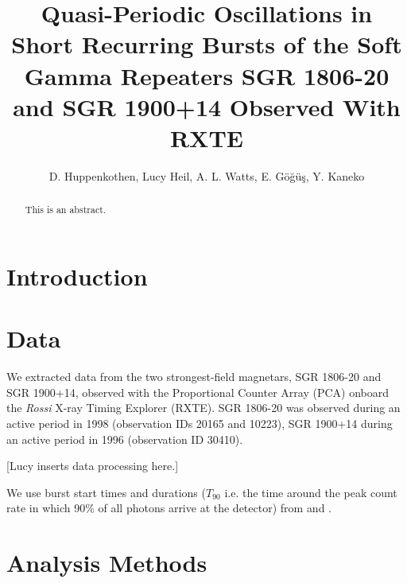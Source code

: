 \documentclass[numberedappendix]{emulateapj}
\begin{document}
\title{Quasi-Periodic Oscillations in Short Recurring Bursts of the Soft Gamma Repeaters SGR 1806-20 and SGR 1900+14 Observed With RXTE}

\author{D. Huppenkothen, Lucy Heil, A. L. Watts,  E. G{\"o}{\u g}{\"u}{\c s}, Y. Kaneko}

 


\begin{abstract}
This is an abstract. 
\end{abstract}
\begin{abstract}
\end{abstract} 



\section{Introduction}

\section{Data}
\label{sec:data}

We extracted data from the two strongest-field magnetars, SGR 1806-20 and SGR 1900+14, observed with the Proportional Counter Array (PCA) onboard the {\it Rossi} X-ray Timing Explorer (RXTE). SGR 1806-20 was observed during an active period in 1998 (observation IDs 20165 and 10223), SGR 1900+14 during an active period in 1996 (observation ID 30410). 

[Lucy inserts data processing here.]

We use burst start times and durations ($T_{90}$ i.e. the time around the peak count rate in which 90\% of all photons arrive at the detector) from \citet{gogus1999} and \citet{gogus2000}. 


\section{Analysis Methods}
\label{sec:analysis}
\end{document}

